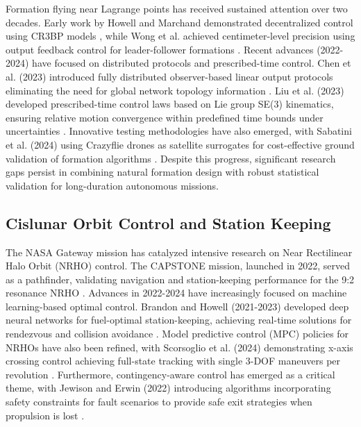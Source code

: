 \documentclass[10pt,letterpaper]{article}
\begin{document}
Formation flying near Lagrange points has received sustained attention over two decades. Early work by Howell and Marchand demonstrated decentralized control using CR3BP models \cite{marchand2005formation}, while Wong et al. achieved centimeter-level precision using output feedback control for leader-follower formations \cite{wong2002lqr}. Recent advances (2022-2024) have focused on distributed protocols and prescribed-time control. Chen et al. (2023) introduced fully distributed observer-based linear output protocols eliminating the need for global network topology information \cite{chen2023distributed}. Liu et al. (2023) developed prescribed-time control laws based on Lie group SE(3) kinematics, ensuring relative motion convergence within predefined time bounds under uncertainties \cite{liu2023prescribed}. Innovative testing methodologies have also emerged, with Sabatini et al. (2024) using Crazyflie drones as satellite surrogates for cost-effective ground validation of formation algorithms \cite{sabatini2024testing}. Despite this progress, significant research gaps persist in combining natural formation design with robust statistical validation for long-duration autonomous missions.

\subsection{Cislunar Orbit Control and Station Keeping}

The NASA Gateway mission has catalyzed intensive research on Near Rectilinear Halo Orbit (NRHO) control. The CAPSTONE mission, launched in 2022, served as a pathfinder, validating navigation and station-keeping performance for the 9:2 resonance NRHO \cite{whitley2023capstone, howell2022capstone}. Advances in 2022-2024 have increasingly focused on machine learning-based optimal control. Brandon and Howell (2021-2023) developed deep neural networks for fuel-optimal station-keeping, achieving real-time solutions for rendezvous and collision avoidance \cite{brandon2021neural, brandon2023deep}. Model predictive control (MPC) policies for NRHOs have also been refined, with Scorsoglio et al. (2024) demonstrating x-axis crossing control achieving full-state tracking with single 3-DOF maneuvers per revolution \cite{scorsoglio2024mpc}. Furthermore, contingency-aware control has emerged as a critical theme, with Jewison and Erwin (2022) introducing algorithms incorporating safety constraints for fault scenarios to provide safe exit strategies when propulsion is lost \cite{jewison2022contingency}.
\end{document}
